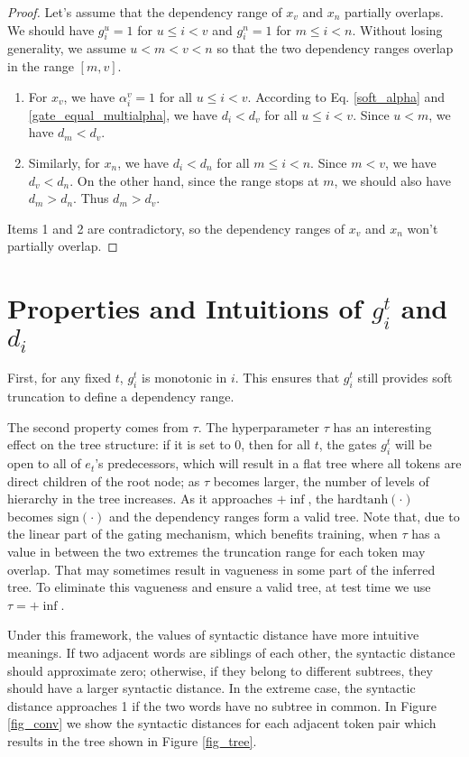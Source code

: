 \documentclass{article} \usepackage{iclr2018_conference,times}
\begin{document}
\begin{proof}
Let's assume that the dependency range of $x_v$ and $x_n$ partially overlaps. We should have 
$g_i^u=1$ for $u \le i < v$ and $g_i^n=1$ for $m \le i < n$. Without losing generality, we assume 
$u<m<v<n$ so that the two dependency ranges overlap in the range $[m, v]$. 
\begin{enumerate}
\item For $x_v$, we have $\alpha_i^v=1$ for all $u \le i < v$. According to Eq. \ref{soft_alpha} and \ref{gate_equal_multialpha}, we have $d_i < d_v$ for all $u \le i < v$. Since $u<m$, we have $d_m < d_v$.
\item Similarly, for $x_n$, we have $d_i < d_n$ for all $m \le i < n$. Since $m<v$, we have $d_v < d_n$. On the other hand, since the range stops at $m$, we should also have $d_m > d_n$. Thus $d_m > d_v$.
\end{enumerate}
Items 1 and 2 are contradictory, so the dependency ranges of $x_v$ and $x_n$ won't partially overlap.
\end{proof}

\section{Properties and Intuitions of $g_i^t$ and $d_i$} 
\label{gd_properties}
First, for any fixed $t$, $g_i^t$ is monotonic in $i$. This ensures that $g_i^t$ still provides soft truncation to define a dependency range. 

The second property comes from $\tau$. The hyperparameter $\tau$ has an interesting effect on the tree structure: if it is set to 0, then for all $t$, the gates $g_i^t$ will be open to all of $e_t$'s predecessors, which will result in a flat tree where all tokens are direct children of the root node; as $\tau$ becomes larger, the number of levels of hierarchy in the tree increases. As it approaches $+\inf$, the $\mathrm{hardtanh}(\cdot)$ becomes $\mathrm{sign}(\cdot)$ and the dependency ranges form a valid tree. Note that, due to the linear part of the gating mechanism, which benefits training, when $\tau$ has a value in between the two extremes the truncation range for each token may overlap. That may sometimes result in vagueness in some part of the inferred tree. To eliminate this vagueness and ensure a valid tree, at test time we use $\tau=+\inf$.

Under this framework, the values of syntactic distance have more intuitive meanings. If two adjacent words are siblings of each other, the syntactic distance should approximate zero; otherwise, if they belong to different subtrees, they should have a larger syntactic distance. In the extreme case, the syntactic distance approaches 1 if the two words have no subtree in common. In Figure \ref{fig_conv} we show the syntactic distances for each adjacent token pair which results in the tree shown in Figure \ref{fig_tree}. 
\end{document}
